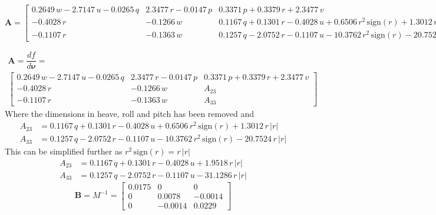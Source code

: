 \documentclass[12pt,a4]{article}
\begin{document}
\begin{equation*}
	\bm{A} = \left[\begin{array}{ccc}
			0.2649\,w-2.7147\,u-0.0265\,q & 2.3477\,r-0.0147\,p & 0.3371\,p+0.3379\,r+2.3477\,v\\
	 		-0.4028\,r & -0.1266\,w & 0.1167\,q+0.1301\,r-0.4028\,u+0.6506\,r^2\,\mathrm{sign}\left(r\right)+1.3012\,r\,\left|r\right|\\
	  	-0.1107\,r & -0.1363\,w & 0.1257\,q-2.0752\,r-0.1107\,u-10.3762\,r^2\,\mathrm{sign}\left(r\right)-20.7524\,r\,\left|r\right|
		\end{array}\right]
\end{equation*}

\begin{multline}
	\bm{A} = \dfrac{df}{d\bm{\nu}}=	\\
	\left[\begin{array}{ccc} 0.2649\,w-2.7147\,u-0.0265\,q & 2.3477\,r-0.0147\,p & 0.3371\,p+0.3379\,r+2.3477\,v \\
			-0.4028\,r                          & -0.1266\,w          & A_{23}                        \\
			-0.1107\,r                          & -0.1363\,w          & A_{33}\end{array}\right]
\end{multline}
Where the dimensions in heave, roll and pitch has been removed and
\begin{align}
	A_{23} & = 0.1167\,q+0.1301\,r-0.4028\,u+0.6506\,r^2\,\mathrm{sign}\left(r\right)+1.3012\,r\,\left|r\right|   \\
	A_{33} & = 0.1257\,q-2.0752\,r-0.1107\,u-10.3762\,r^2\,\mathrm{sign}\left(r\right)-20.7524\,r\,\left|r\right|
\end{align}
This can be simplified further as $r^2 \,\mathrm{sign}(r) = r\,|r|$
\begin{align}
	A_{23} & = 0.1167\,q+0.1301\,r-0.4028\,u+	    1.9518\,r\,\left|r\right| \\
	A_{33} & = 0.1257\,q-2.0752\,r-0.1107\,u-	   31.1286\,r\,\left|r\right|
\end{align}
\begin{equation}
	\bm{B} = M^{-1} = \left[\begin{array}{ccc} 0.0175 & 0 & 0\\ 0 & 0.0078 & -0.0014\\ 0 & -0.0014 & 0.0229 \end{array}\right]
\end{equation}
\end{document}
